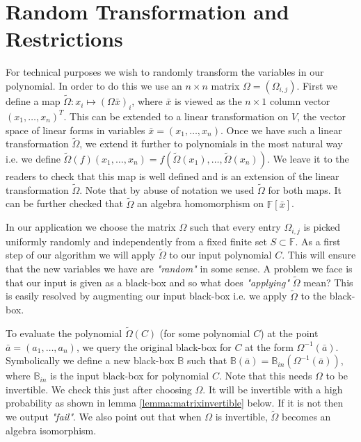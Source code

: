 \documentclass[12pt]{caltech_thesis}
\theoremstyle{plain}
\theoremstyle{definition}
\newcommand{\F}{\mathbb{F}}
\newcommand{\CB}{\mathbb{B}}
\newcommand{\B}[1]{\bar{#1}}
\begin{document}
\chapter{Random Transformation and Restrictions}\label{appendix:randomtransform}

For technical purposes we wish to randomly transform the variables in our polynomial. In order to do this we use an $n\times n$ matrix
$\Omega =(\Omega_{i,j})$. First we define a map $\tilde \Omega : x_i\mapsto (\Omega \B{x} )_i$,
where $\B{x}$ is viewed as the $n\times 1$ column vector $(x_1,\ldots,x_n)^{T}$. This can be extended to a linear transformation on $V$, the vector space of
linear forms in variables $\B{x} = (x_1,\ldots,x_n)$. Once we have such a linear transformation $\tilde \Omega$, we extend it further to polynomials in the most
natural way i.e. we define $\tilde\Omega(f)(x_1,\ldots,x_n) =
f(\tilde \Omega(x_1),\ldots,\tilde \Omega(x_n))$. We leave it to the readers to check that this map is well defined and is an extension of the linear transformation
$\tilde \Omega$. Note that
by abuse of notation we used $\tilde\Omega$ for both maps. It can be further checked that $\tilde \Omega$ an algebra homomorphism on $\F[\B{x}]$.

In our application we choose the matrix $\Omega$ such that every entry $\Omega_{i,j}$ is picked uniformly randomly and independently from a fixed finite
set $S\subset \F$. As a first step of our algorithm  we will apply $\tilde \Omega$ to our input polynomial $C$.
This will ensure that the new variables we have are \emph{"random"} in some sense. A problem we face is that our input is given as a black-box and so what does
\emph{"applying"} $\tilde\Omega$ mean? This is easily resolved by augmenting our
input black-box i.e. we apply $\tilde \Omega$ to the black-box.

To evaluate the polynomial $\tilde\Omega(C)$ (for some polynomial $C$) at the point $\B{a} = (a_1,\ldots,a_n)$, we query the original black-box for $C$ 
at the
form $\Omega^{-1}(\B{a})$. Symbolically we define a new black-box $\CB$ such that $\CB(\B{a}) = \CB_{in}(\Omega^{-1}(\B{a}))$, where $\CB_{in}$ is the
input black-box for polynomial $C$. Note that this needs $\Omega$ to be invertible. We check this just after choosing $\Omega$.
It will be invertible with a high probability as shown in lemma \ref{lemma:matrixinvertible} below.  If it is not then we output \emph{"fail"}. We also 
point out that when $\Omega$ is invertible,
$\tilde \Omega$ becomes an algebra isomorphism.
\end{document}
